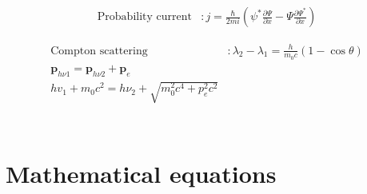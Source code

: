 \documentclass[12pt,a4paper]{article}
\begin{document}
	\begin{align*}
		\text{Probability current} & : j = \frac{\hbar}{2mi} (\psi ^* \frac{\partial \Psi}{\partial x} - \Psi \frac{\partial \Psi ^*}{\partial x})
	\end{align*}
	\begin{center}
	\begin{align*}
		\text{Compton scattering} & : \lambda_2 - \lambda_1 = \frac{h}{m_0 c} (1 - \cos\theta) \\
		\textbf{p}_{h\nu 1} = \textbf{p}_{h\nu 2} + \textbf{p}_e \\
		hv_1 + m_0c^2 = h\nu_2 + \sqrt{m_0^2 c^4 + p_e^2 c^2} \\
	\end{align*}
	\end{center}
	\begin{align*}
		\text{}
	\end{align*}
	
	
	
	
	
	
	
	
	
	
	
	
	
	
	
	
	
	
	
	
	
		\section*{Mathematical equations}
\end{document}
